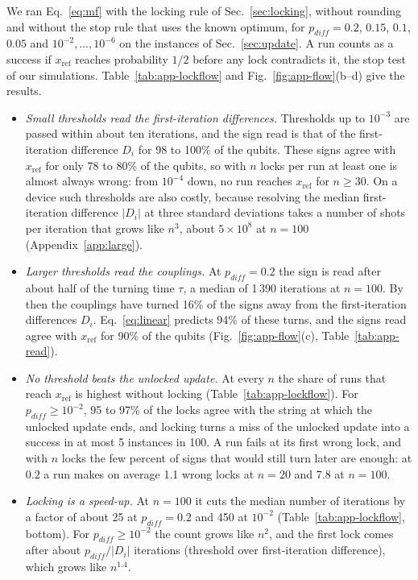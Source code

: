 \documentclass[onecolumn,10pt]{article}
\theoremstyle{remark}
\theoremstyle{plain}
\begin{document}
We ran Eq.~\eqref{eq:mf} with the locking rule of Sec.~\ref{sec:locking}, without rounding and without the stop rule that uses the known optimum, for $p_{diff}=0.2$, $0.15$, $0.1$, $0.05$ and $10^{-2},\dots,10^{-6}$ on the instances of Sec.~\ref{sec:update}. A run counts as a success if $x_{\mathrm{ref}}$ reaches probability $1/2$ before any lock contradicts it, the stop test of our simulations. Table~\ref{tab:app-lockflow} and Fig.~\ref{fig:app-flow}(b--d) give the results.
\begin{itemize}
\item \emph{Small thresholds read the first-iteration differences.} Thresholds up to $10^{-3}$ are passed within about ten iterations, and the sign read is that of the first-iteration difference $D_i$ for 98 to 100\% of the qubits. These signs agree with $x_{\mathrm{ref}}$ for only 78 to 80\% of the qubits, so with $n$ locks per run at least one is almost always wrong: from $10^{-4}$ down, no run reaches $x_{\mathrm{ref}}$ for $n\ge30$. On a device such thresholds are also costly, because resolving the median first-iteration difference $|D_i|$ at three standard deviations takes a number of shots per iteration that grows like $n^3$, about $5\times10^8$ at $n=100$ (Appendix~\ref{app:large}).
\item \emph{Larger thresholds read the couplings.} At $p_{diff}=0.2$ the sign is read after about half of the turning time $\tau$, a median of 1\,390 iterations at $n=100$. By then the couplings have turned 16\% of the signs away from the first-iteration differences $D_i$. Eq.~\eqref{eq:linear} predicts 94\% of these turns, and the signs read agree with $x_{\mathrm{ref}}$ for 90\% of the qubits (Fig.~\ref{fig:app-flow}(c), Table~\ref{tab:app-read}).
\item \emph{No threshold beats the unlocked update.} At every $n$ the share of runs that reach $x_{\mathrm{ref}}$ is highest without locking (Table~\ref{tab:app-lockflow}). For $p_{diff}\ge10^{-2}$, 95 to 97\% of the locks agree with the string at which the unlocked update ends, and locking turns a miss of the unlocked update into a success in at most 5 instances in 100. A run fails at its first wrong lock, and with $n$ locks the few percent of signs that would still turn later are enough: at $0.2$ a run makes on average 1.1 wrong locks at $n=20$ and 7.8 at $n=100$.
\item \emph{Locking is a speed-up.} At $n=100$ it cuts the median number of iterations by a factor of about 25 at $p_{diff}=0.2$ and 450 at $10^{-2}$ (Table~\ref{tab:app-lockflow}, bottom). For $p_{diff}\ge10^{-2}$ the count grows like $n^2$, and the first lock comes after about $p_{diff}/|D_i|$ iterations (threshold over first-iteration difference), which grows like $n^{1.4}$.
\end{itemize}
\end{document}
